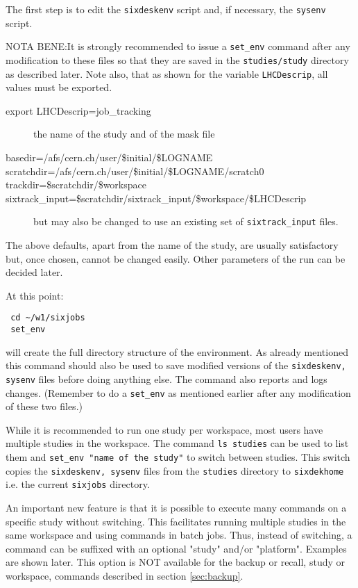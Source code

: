 \documentclass{cernatsnote}    %
\begin{document}
The first step is to edit the {\tt sixdeskenv} script and, if necessary, 
the {\tt sysenv} script.

NOTA BENE:It is strongly recommended to issue
a {\tt set\_env} command after any modification to these files so that 
they are saved in the {\tt studies/study} directory as described later.
Note also, that as shown for the variable {\tt LHCDescrip}, all values must be exported.

\begin{description}
\item [export LHCDescrip=job\_tracking] the name of the study and of the mask file
\item [basedir=/afs/cern.ch/user/\$initial/\$LOGNAME]
\item [scratchdir=/afs/cern.ch/user/\$initial/\$LOGNAME/scratch0]
\item [trackdir=\$scratchdir/\$workspace]
\item [sixtrack\_input=\$scratchdir/sixtrack\_input/\$workspace/\$LHCDescrip]
 but may also be changed to use an existing set of {\tt sixtrack\_input} files.
\end{description}
The above defaults, apart from the name of the study,
are usually satisfactory but, once chosen,
cannot be changed easily. Other parameters of the run can be decided later.

At this point:
\begin{verbatim}
 cd ~/w1/sixjobs
 set_env
\end{verbatim}
will create the full directory structure of the environment.
As already mentioned this command should also be used to save
modified versions of the {\tt sixdeskenv, sysenv} files before doing
anything else. The command also reports and logs changes. 
(Remember to do a {\tt set\_env} as mentioned earlier after
any modification of these two files.)

While it is recommended to run one study per workspace, most users have
multiple studies in the workspace. The command {\tt ls studies} can be used
to list them and {\tt set\_env "name of the study"} to switch between studies.
This switch copies the {\tt sixdeskenv, sysenv} files from the
{\tt studies} directory to {\tt sixdekhome} i.e. the current {\tt sixjobs} directory. 

An important new feature is that it is possible to execute many commands
on a specific study without switching. This facilitates running multiple
studies in the same workspace and using commands in batch jobs.  
Thus, instead of switching, a command can be suffixed with an optional
"study" and/or "platform". Examples are shown later.
This option is NOT available for the backup or recall, study or workspace, 
commands described in section \ref{sec:backup}.
\end{document}

